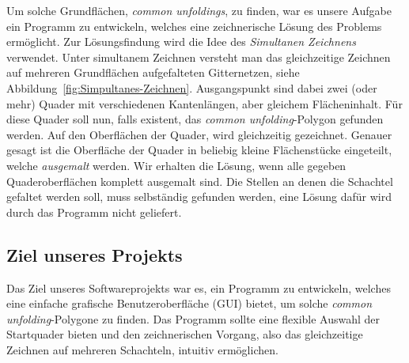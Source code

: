 Um solche Grundflächen, \emph{common unfoldings}, zu finden, war es unsere Aufgabe ein Programm zu entwickeln, welches eine zeichnerische Lösung des Problems ermöglicht. Zur Lösungsfindung wird die Idee des \emph{Simultanen Zeichnens} verwendet. Unter simultanem Zeichnen versteht man das gleichzeitige Zeichnen auf mehreren Grundflächen \bzw aufgefalteten Gitternetzen, siehe Abbildung~\ref{fig:Simpultanes-Zeichnen}. Ausgangspunkt sind dabei zwei (oder mehr) Quader mit verschiedenen Kantenlängen, aber gleichem Flächeninhalt. Für diese Quader soll nun, falls existent, das \emph{common unfolding}-Polygon gefunden werden. Auf den Oberflächen der Quader, wird gleichzeitig gezeichnet. Genauer gesagt ist die Oberfläche der Quader in beliebig kleine Flächenstücke eingeteilt, welche \emph{ausgemalt} werden. Wir erhalten die Lösung, wenn alle gegeben Quaderoberflächen komplett ausgemalt sind. Die Stellen an denen die Schachtel gefaltet werden soll, muss selbständig gefunden werden, eine Lösung dafür wird durch das Programm nicht geliefert. 





\subsection{Ziel unseres Projekts}
\label{subsec:ziele}

Das Ziel unseres Softwareprojekts war es, ein Programm zu entwickeln, welches eine einfache grafische Benutzeroberfläche (GUI) bietet, um solche \emph{common unfolding}-Polygone zu finden. Das Programm sollte eine flexible Auswahl der Startquader bieten und den zeichnerischen Vorgang, also das gleichzeitige Zeichnen auf mehreren Schachteln, intuitiv ermöglichen.


